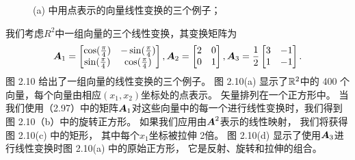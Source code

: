 \begin{example}[向量的线性变换]
    \begin{figure}[H]
        \caption{(a) 中用点表示的向量线性变换的三个例子；}
    \end{figure}
    我们考虑$R^2$中一组向量的三个线性变换，其变换矩阵为
    \begin{equation}
        \boldsymbol{A}_1 =
        \begin{bmatrix}
            \cos(\frac{\pi}{4}) & -\sin(\frac{\pi}{4}) \\
            \sin(\frac{\pi}{4}) & \cos(\frac{\pi}{4})
        \end{bmatrix},
        \boldsymbol{A}_2 =
        \begin{bmatrix}
            2 & 0 \\
            0 & 1
        \end{bmatrix},
        \boldsymbol{A}_3 =
        \frac{1}{2}
        \begin{bmatrix}
            3 & -1 \\
            1 & -1
        \end{bmatrix}.
    \end{equation}
    图 2.10 给出了一组向量的线性变换的三个例子。
    图 2.10(a) 显示了$\mathbb{R}^2$中的 400 个向量，每个向量由相应$(x_1 , x_2 )$坐标处的点表示。
    矢量排列在一个正方形中。
    当我们使用（2.97）中的矩阵$\boldsymbol{A}_1$对这些向量中的每一个进行线性变换时，我们得到图 2.10（b）中的旋转正方形。
    如果我们应用由$\boldsymbol{A}^2$表示的线性映射， 我们将获得图 2.10(c) 中的矩形， 其中每个$x_1$坐标被拉伸 2倍。
    图 2.10(d) 显示了使用$\boldsymbol{A}_3$进行线性变换时图 2.10(a) 中的原始正方形， 它是反射、旋转和拉伸的组合。
\end{example}

